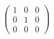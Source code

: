 \documentclass[preview]{standalone}
\begin{document}
\begin{align*}
\begin{pmatrix}1 & 0 & 0 \\0 & 1 & 0 \\0 & 0 & 0\end{pmatrix}
\end{align*}
\end{document}
